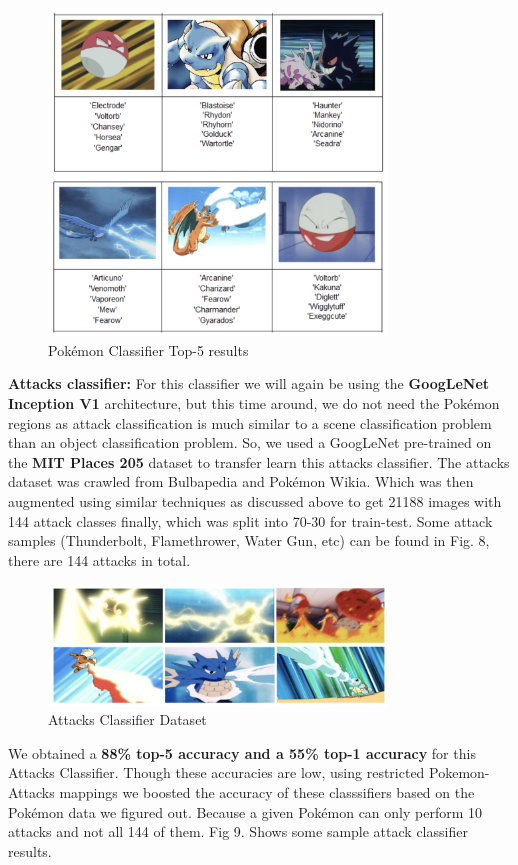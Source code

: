 \documentclass[journal, a4paper]{IEEEtran}
\begin{document}
\begin{figure}[ht]
    \caption{Pok\'emon Classifier Top-5 results}
\centering
 \includegraphics[scale = 0.6, width=9cm]{poke_results.png}
    \end{figure}

\textbf{Attacks classifier:} For this classifier we will again be using the \textbf{GoogLeNet Inception V1} architecture, but this time around, we do not need the Pok\'emon regions as attack classification is much similar to a scene classification problem than an object classification problem. So, we used a GoogLeNet pre-trained on the \textbf{MIT Places 205}\cite{MIT 205 PLACES} dataset to transfer learn this attacks classifier. The attacks dataset was crawled from Bulbapedia \cite{BULBAPEDIA} and Pok\'emon Wikia\cite{WIKIA}. Which was then augmented using similar techniques as discussed above to get 21188 images with 144 attack classes finally, which was split into 70-30 for train-test. Some attack samples (Thunderbolt, Flamethrower, Water Gun, etc) can be found in Fig. 8, there are 144 attacks in total.

\begin{figure}[ht]
    \caption{Attacks Classifier Dataset}
\centering
 \includegraphics[scale = 0.6, width=9cm]{attack.png}
\end{figure}

We obtained a \textbf{88\% top-5 accuracy and a 55\% top-1 accuracy} for this Attacks Classifier. Though these accuracies are low, using restricted Pokemon-Attacks mappings we boosted the accuracy of these classsifiers based on the Pok\'emon data we figured out. Because a given Pok\'emon can only perform 10 attacks and not all 144 of them. Fig 9. Shows some sample attack classifier results.
\end{document}
